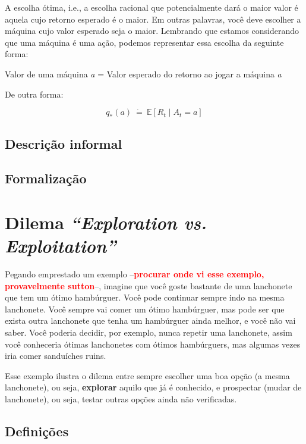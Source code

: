 \documentclass{article}
\newcommand{\todo}[1]{ --\textcolor{red}{\textbf{#1}}--}
\begin{document}
    A escolha ótima, i.e., a escolha racional que potencialmente dará o maior valor é aquela cujo retorno esperado é o maior. Em outras palavras, você deve escolher a máquina cujo valor esperado seja o maior. Lembrando que estamos considerando que uma máquina é uma ação, podemos representar essa escolha da seguinte forma:
    
    Valor de uma máquina \textit{a} = Valor esperado do retorno ao jogar a máquina \textit{a}
    
    De outra forma:
    
    \begin{equation}
        q_*(a) \ \dot{=} \ \mathbb{E}[R_t \mid A_t = a]
    \end{equation}

    \subsection{Descrição informal}
    
    \subsection{Formalização}

\section{Dilema \textit{``Exploration vs. Exploitation''}}

    Pegando emprestado um exemplo \todo{procurar onde vi esse exemplo, provavelmente sutton}, imagine que você goste bastante de uma lanchonete que tem um ótimo hambúrguer. Você pode continuar sempre indo na mesma lanchonete. Você sempre vai comer um ótimo hambúrguer, mas pode ser que exista outra lanchonete que tenha um hambúrguer ainda melhor, e você não vai saber. Você poderia decidir, por exemplo, nunca repetir uma lanchonete, assim você conheceria ótimas lanchonetes com ótimos hambúrguers, mas algumas vezes iria comer sanduíches ruins.
    
    Esse exemplo ilustra o dilema entre sempre escolher uma boa opção (a mesma lanchonete), ou seja, \textbf{explorar} aquilo que já é conhecido, e prospectar (mudar de lanchonete), ou seja, testar outras opções ainda não verificadas. 

    \subsection{Definições}
    
\end{document}
